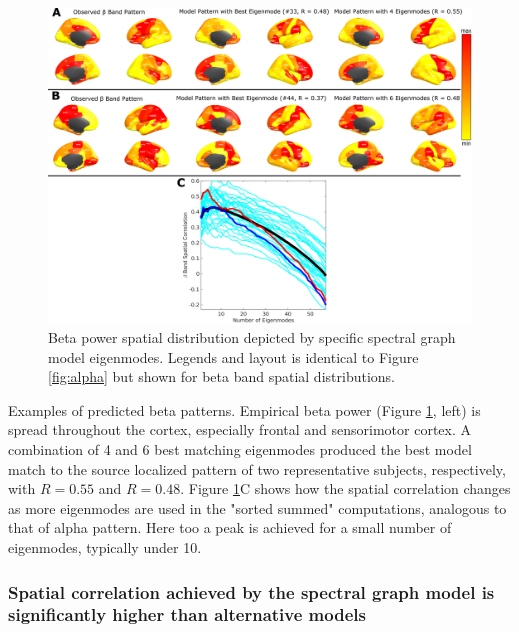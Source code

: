 \begin{figure}[htbp]
    \centering
    \includegraphics[width=\textwidth]{../figures/chapter5/fig6_beta.png}
    \caption{Beta power spatial distribution depicted by specific spectral graph model eigenmodes. Legends and layout is identical to Figure \ref{fig:alpha} but shown for beta band spatial distributions.}
    \label{fig:beta}
\end{figure}

Examples of predicted beta patterns. Empirical beta power
(Figure \ref{fig:beta}, left) is spread throughout the cortex, especially
frontal and sensorimotor cortex. A combination of 4 and 6 best matching
eigenmodes produced the best model match to the source localized pattern
of two representative subjects, respectively, with $R = 0.55$ and $R=0.48$.
Figure \ref{fig:beta}C shows how the spatial correlation changes as more
eigenmodes are used in the "sorted summed" computations, analogous to
that of alpha pattern. Here too a peak is achieved for a small number of
eigenmodes, typically under 10.

\subsubsection{Spatial correlation achieved by the spectral graph model is
significantly higher than alternative models}

